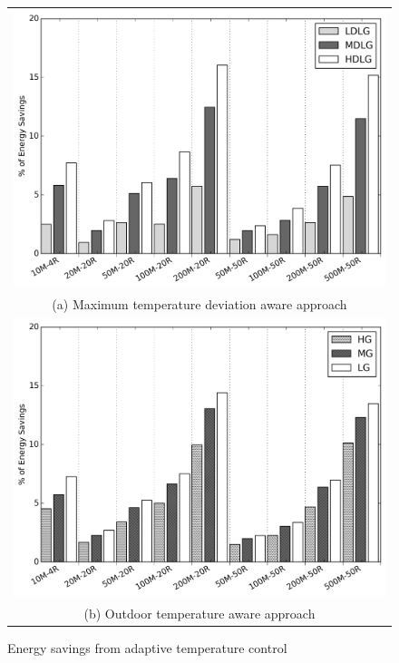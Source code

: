 \begin{figure}
\centering
\begin{tabular}{c}
  \includegraphics[width=0.9\linewidth]{figs/perc_energy_diff_temp_flex_def_vs_oarb_mtd.png} \\
(a) Maximum temperature deviation aware approach \\[6pt]
  \includegraphics[width=0.9\linewidth]{figs/perc_energy_diff_temp_flex_def_vs_oarb_oat.png} \\
(b) Outdoor temperature aware approach \\[6pt]
\end{tabular}
\caption{Energy savings from adaptive temperature control}
\label{fig:atc_eg}
\end{figure}

